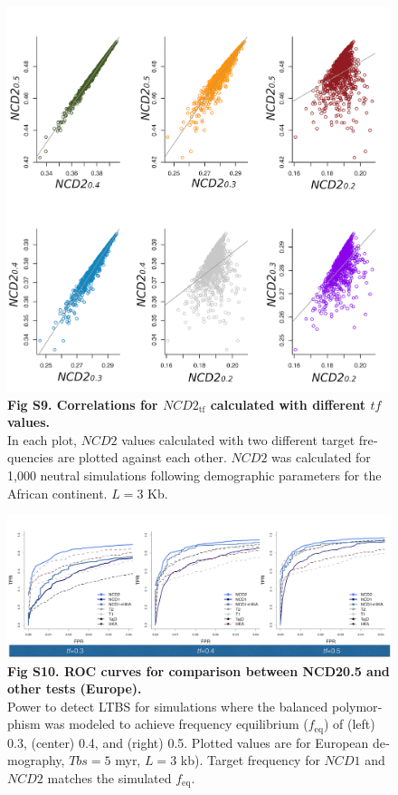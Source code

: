 \begin{refsection}
\begin{otherlanguage}{english}
\begin{figure}
\end{figure}
%
\begin{figure}[tbph]
\includegraphics[]{chap2_folder/supp_figures/S9_Fig.png}
\caption*{\textbf{Fig S9. Correlations for $NCD2_{\mathrm{tf}}$ calculated with different $tf$ values.}\\
In each plot, $NCD2$ values calculated with two different target frequencies are plotted against each other. $NCD2$ was calculated for 1,000 neutral simulations following demographic parameters for the African continent. $L= 3$ Kb.
}
\end{figure}
%
\begin{figure}
\includegraphics[]{chap2_folder/supp_figures/S10.png}
\caption*{\textbf{Fig S10. ROC curves for comparison between NCD20.5 and other tests (Europe). }\\
Power to detect LTBS for simulations where the balanced polymorphism was modeled to achieve frequency equilibrium ($f_{\mathrm{eq}}$) of (left) 0.3, (center) 0.4, and (right) 0.5. Plotted values are for European demography, $Tbs = 5$ myr, $L = 3$ kb). Target frequency for $NCD1$ and $NCD2$ matches the simulated $f_{\mathrm{eq}}$. 
}
\end{figure}


\end{otherlanguage}
\end{refsection}
